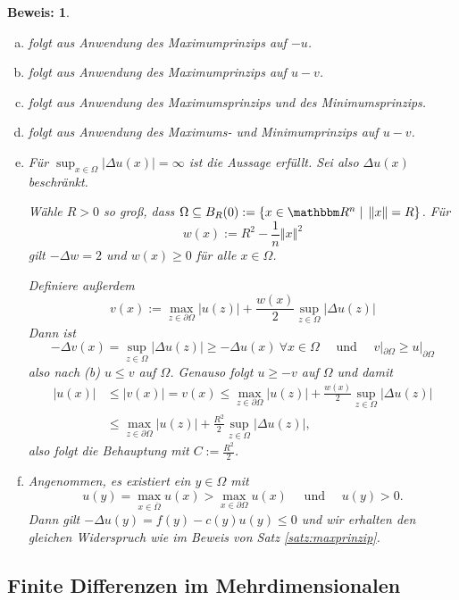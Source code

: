 \documentclass[12pt,a4paper]{book}
\theoremstyle{break}
\theoremstyle{nonumberplain}
\newtheorem{beweis}{Beweis:}
\newcommand{\R}{\mathbbm R}
\newcommand{\norm}[1]{\left\Vert#1\right\Vert}		%
\newcommand{\1}{\mathbbm{1}} 			      	%
\begin{document}
\begin{beweis}
\begin{enumerate}[(a)]
\item folgt aus Anwendung des Maximumprinzips auf $-u$.
\item folgt aus Anwendung des Maximumprinzips auf $u-v$.
\item folgt aus Anwendung des Maximumsprinzips und des Minimumsprinzips.
\item folgt aus Anwendung des Maximums- und Minimumprinzips auf $u-v$.
\item Für $\sup_{x\in \Omega}|\Delta u(x)|=\infty$ ist die Aussage erfüllt. Sei also $\Delta u(x)$ beschränkt.

Wähle $R>0$ so groß, dass $\Omega\subseteq B_R(0):=\{ x\in \R^n\;|\; \norm{x}=R\}$.
Für
\[
w(x):=R^2-\frac{1}{n}\norm{x}^2
\]
gilt $-\Delta w=2$ und $w(x)\geq 0$ für alle $x\in \Omega$.

Definiere außerdem
\[
v(x):=\max_{z\in \partial \Omega} |u(z)| + \frac{w(x)}{2} \sup_{z\in \Omega}|\Delta u(z)|
\]
Dann ist
\[
-\Delta v(x)=  \sup_{z\in \Omega}|\Delta u(z)|\geq -\Delta u(x) \ \forall x\in \Omega \quad \mbox{ und } \quad
v|_{\partial \Omega} \geq u|_{\partial \Omega}
\]
also nach (b) $u\leq v$ auf $\Omega$. Genauso folgt $u\geq -v$ auf $\Omega$ und damit
\begin{align*}
|u(x)|&\leq |v(x)|=v(x)\leq \max_{z\in \partial \Omega} |u(z)| + \frac{w(x)}{2} \sup_{z\in \Omega}|\Delta u(z)|\\
&\leq \max_{z\in \partial \Omega} |u(z)| + \frac{R^2}{2} \sup_{z\in \Omega}|\Delta u(z)|,
\end{align*}
also folgt die Behauptung mit $C:=\frac{R^2}{2}$.
%
\item Angenommen, es existiert ein $y\in \Omega$ mit 
\[
u(y)=\max_{x\in \overline \Omega} u(x)>\max_{x\in \partial \Omega} u(x) \quad \mbox{ und } \quad u(y)>0.
\]
Dann gilt $-\Delta u(y)=f(y)-c(y)u(y)\leq 0$ und wir erhalten den gleichen Widerspruch wie im Beweis von Satz \ref{satz:maxprinzip}.
\end{enumerate}

\end{beweis}




\subsection{Finite Differenzen im Mehrdimensionalen}
\end{document}
